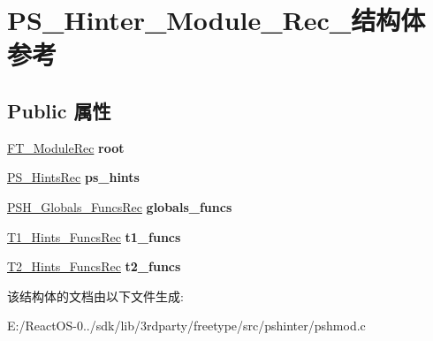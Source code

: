 \hypertarget{struct_p_s___hinter___module___rec__}{}\section{P\+S\+\_\+\+Hinter\+\_\+\+Module\+\_\+\+Rec\+\_\+结构体 参考}
\label{struct_p_s___hinter___module___rec__}
\subsection*{Public 属性}
\begin{DoxyCompactItemize}
\item 
\mbox{\label{struct_p_s___hinter___module___rec___a8bf8cd4d78b4f2b21b2f066c1544e0f5}} 
\hyperlink{struct_f_t___module_rec__}{F\+T\+\_\+\+Module\+Rec} {\bfseries root}
\item 
\mbox{\label{struct_p_s___hinter___module___rec___a78af21517f974c2f96bf09fd146c9835}} 
\hyperlink{struct_p_s___hints_rec__}{P\+S\+\_\+\+Hints\+Rec} {\bfseries ps\+\_\+hints}
\item 
\mbox{\label{struct_p_s___hinter___module___rec___a2cee2883441a832ec90fef2f88a9f7a0}} 
\hyperlink{struct_p_s_h___globals___funcs_rec__}{P\+S\+H\+\_\+\+Globals\+\_\+\+Funcs\+Rec} {\bfseries globals\+\_\+funcs}
\item 
\mbox{\label{struct_p_s___hinter___module___rec___ad28fed56d50ab35983e0731974d0b045}} 
\hyperlink{struct_t1___hints___funcs_rec__}{T1\+\_\+\+Hints\+\_\+\+Funcs\+Rec} {\bfseries t1\+\_\+funcs}
\item 
\mbox{\label{struct_p_s___hinter___module___rec___a16794782a20aaaf1947537433381372e}} 
\hyperlink{struct_t2___hints___funcs_rec__}{T2\+\_\+\+Hints\+\_\+\+Funcs\+Rec} {\bfseries t2\+\_\+funcs}
\end{DoxyCompactItemize}


该结构体的文档由以下文件生成\+:\begin{DoxyCompactItemize}
\item 
E\+:/\+React\+O\+S-\/0../sdk/lib/3rdparty/freetype/src/pshinter/pshmod.\+c\end{DoxyCompactItemize}
